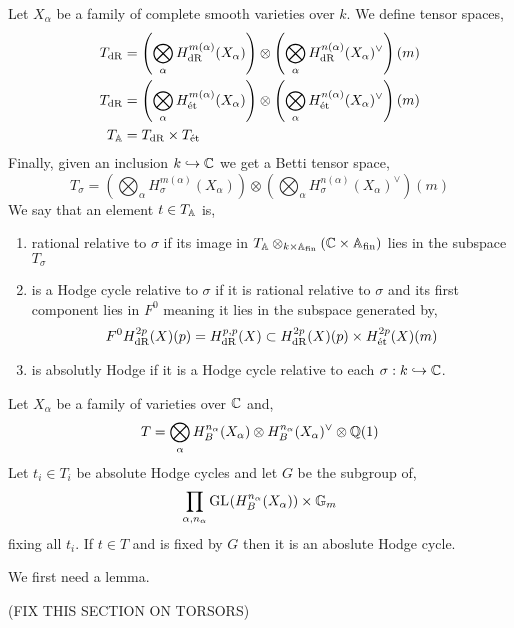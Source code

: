 \documentclass[12pt]{article}
\begin{document}
\begin{definition}
Let $X_\alpha$ be a family of complete smooth varieties over $k$. We define tensor spaces,
\begin{align*}
T_{\mathrm{dR}} & = \left( \bigotimes_{\alpha} H_{\mathrm{dR}}^{m(\alpha)} (X_\alpha) \right) \otimes \left( \bigotimes_{\alpha} H^{n(\alpha)}_{\mathrm{dR}}(X_\alpha)^\vee \right) (m)
\\
T_{\mathrm{dR}} & = \left( \bigotimes_{\alpha} H_{\text{\'{e}t}}^{m(\alpha)} (X_\alpha) \right) \otimes \left( \bigotimes_{\alpha} H^{n(\alpha)}_{\text{\'{e}t}}(X_\alpha)^\vee \right) (m)
\\
T_{\mathbb{A}} & = T_{\mathrm{dR}} \times T_{\text{\'{e}t}}
\end{align*}
Finally, given an inclusion $k \hookrightarrow \mathbb{C}$ we get a Betti tensor space,
\[ T_{\sigma} = \left( \bigotimes_{\alpha} H_{\sigma}^{m(\alpha)} (X_\alpha) \right) \otimes \left( \bigotimes_{\alpha} H^{n(\alpha)}_{\sigma}(X_\alpha)^\vee \right) (m) \]
We say that an element $t \in T_{\mathbb{A}}$ is,
\begin{enumerate}
\item rational relative to $\sigma$ if its image in $T_{\mathbb{A}} \otimes_{k \times \mathbb{A}_{\text{fin}}} (\mathbb{C} \times \mathbb{A}_{\text{fin}})$ lies in the subspace $T_{\sigma}$
\item is a Hodge cycle relative to $\sigma$ if it is rational relative to $\sigma$ and its first component lies in $F^0$ meaning it lies in the subspace generated by,
\[ F^0 H_{\mathrm{dR}}^{2p}(X)(p) = H^{p,p}_{\mathrm{dR}}(X) \subset H_{\mathrm{dR}}^{2p}(X)(p) \times H^{2p}_{\text{\'{e}t}}(X)(m) \]
\item is absolutly Hodge if it is a Hodge cycle relative to each $\sigma : k \hookrightarrow \mathbb{C}$.
\end{enumerate}
\end{definition}

\begin{theorem}[Principle A]
Let $X_\alpha$ be a family of varieties over $\mathbb{C}$ and,
\[ T = \bigotimes_{\alpha} H_B^{n_\alpha}(X_\alpha) \otimes H^{n_\alpha}_B(X_\alpha)^\vee \otimes \mathbb{Q}(1) \]
Let $t_i \in T_i$ be absolute Hodge cycles and let $G$ be the subgroup of,
\[ \prod_{\alpha, n_\alpha} \mathrm{GL}_{}(H^{n_\alpha}_B(X_\alpha)) \times \mathbb{G}_m \]
fixing all $t_i$. If $t \in T$ and is fixed by $G$ then it is an aboslute Hodge cycle.  
\end{theorem}

\begin{remark}
We first need a lemma.
\end{remark}

(FIX THIS SECTION ON TORSORS)
\end{document}

